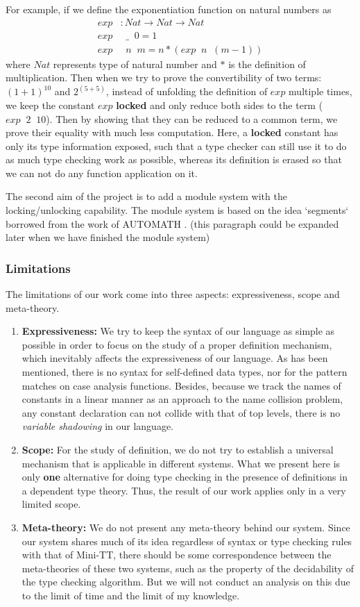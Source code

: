 \documentclass{article}
\theoremstyle{remark}
\begin{document}
For example, if we define the exponentiation function on natural numbers as
\begin{align*}
  exp &: Nat \to Nat \to Nat \\
  exp &\;\; \_\;\; 0 = 1 \\
  exp &\;\; n \;\; m = n * (exp \;\; n \;\; (m - 1))
\end{align*}
where $Nat$ represents type of natural number and $*$ is the definition of multiplication. Then when we try to prove the convertibility of two terms: $(1 + 1)^{10}$ and $2 ^ {(5+5)}$, instead of unfolding the definition of $exp$ multiple times, we keep the constant $exp$ \textbf{locked} and only reduce both sides to the term ($exp \;\; 2 \;\; 10$). Then by showing that they can be reduced to a common term, we prove their equality with much less computation. Here, a \textbf{locked} constant has only its type information exposed, such that a type checker can still use it to do as much type checking work as possible, whereas its definition is erased so that we can not do any function application on it.

The second aim of the project is to add a module system with the locking/unlocking capability. The module system is based on the idea `segments` borrowed from the work of AUTOMATH \cite{de1994survey}. (this paragraph could be expanded later when we have finished the module system)

\subsubsection{Limitations}
The limitations of our work come into three aspects: expressiveness, scope and meta-theory.
\begin{enumerate}
\item \textbf{Expressiveness:} We try to keep the syntax of our language as simple as possible in order to focus on the study of a proper definition mechanism, which inevitably affects the expressiveness of our language. As has been mentioned, there is no syntax for self-defined data types, nor for the pattern matches on case analysis functions. Besides, because we track the names of constants in a linear manner as an approach to the name collision problem, any constant declaration can not collide with that of top levels, there is no \emph{variable shadowing} in our language.
\item \textbf{Scope:} For the study of definition, we do not try to establish a universal mechanism that is applicable in different systems. What we present here is only \textbf{one} alternative for doing type checking in the presence of definitions in a dependent type theory. Thus, the result of our work applies only in a very limited scope.
\item \textbf{Meta-theory:} We do not present any meta-theory behind our system. Since our system shares much of its idea regardless of syntax or type checking rules with that of Mini-TT, there should be some correspondence between the meta-theories of these two systems, such as the property of the decidability of the type checking algorithm. But we will not conduct an analysis on this due to the limit of time and the limit of my knowledge. 
\end{enumerate}
\end{document}
